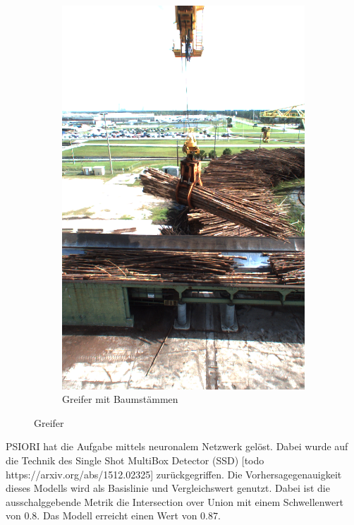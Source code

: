 \begin{figure}[h]
\begin{subfigure}[c]{0.49\textwidth}
			\label{img:Grapple}	
		\end{subfigure}
		\begin{subfigure}[c]{0.49\textwidth}			
			\includegraphics[width=1\textwidth, center]{bilder/Grundlagen/Logs_14.png}
			\caption[Bsp. Bild: Greifer mit Baumstämmen]{Greifer mit Baumstämmen}
			\label{img:Logs}	
		\end{subfigure}
		\caption{Greifer}
		\label{img:Greifer}
	\end{figure}	

	PSIORI hat die Aufgabe mittels neuronalem Netzwerk gelöst. Dabei wurde auf die Technik des Single Shot MultiBox Detector (SSD) [todo https://arxiv.org/abs/1512.02325] zurückgegriffen. Die Vorhersagegenauigkeit dieses Modells wird als Basislinie und Vergleichswert genutzt. Dabei ist  die ausschalggebende Metrik die Intersection over Union mit einem Schwellenwert von 0.8. Das Modell erreicht einen Wert von $0.87$.
	
